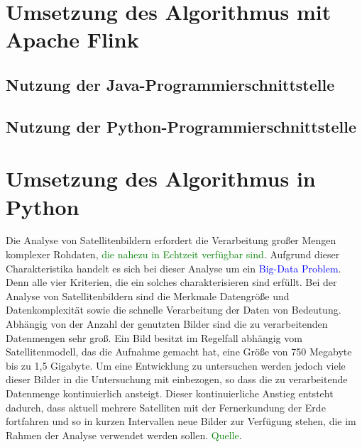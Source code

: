 \section{Umsetzung des Algorithmus mit Apache Flink}
\subsection{Nutzung der Java-Programmierschnittstelle}
\subsection{Nutzung der Python-Programmierschnittstelle}
\section{Umsetzung des Algorithmus in Python}
Die Analyse von Satellitenbildern erfordert die Verarbeitung großer Mengen komplexer Rohdaten, \textcolor{green}{die nahezu in Echtzeit verfügbar sind}. Aufgrund dieser Charakteristika handelt es sich bei dieser Analyse um ein \textcolor{blue}{Big-Data Problem}. Denn alle vier Kriterien, die ein solches charakterisieren sind erfüllt.
\newline
Bei der Analyse von Satellitenbildern sind die Merkmale Datengröße und Datenkomplexität sowie die schnelle Verarbeitung der Daten von Bedeutung. Abhängig von der Anzahl der genutzten Bilder sind die zu verarbeitenden Datenmengen sehr groß. Ein Bild besitzt im Regelfall abhängig vom Satellitenmodell, das die Aufnahme gemacht hat, eine Größe von 750 Megabyte bis zu 1,5 Gigabyte. Um eine Entwicklung zu untersuchen werden jedoch viele dieser Bilder in die Untersuchung mit einbezogen, so dass die zu verarbeitende Datenmenge kontinuierlich ansteigt. Dieser kontinuierliche Anstieg entsteht dadurch, dass aktuell mehrere Satelliten mit der Fernerkundung der Erde fortfahren und so in kurzen Intervallen neue Bilder zur Verfügung stehen, die im Rahmen der Analyse verwendet werden sollen. \textcolor{green}{Quelle}.



